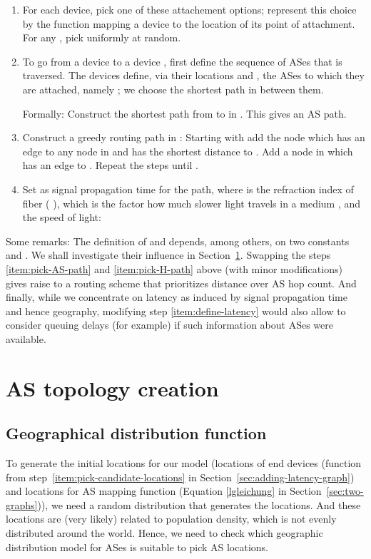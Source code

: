 \documentclass{sig-alternate-10pt}
\begin{document}
\begin{enumerate}
\begin{enumerate}
\item \label{item:pick-location} For each device, pick one of these attachement options; represent this choice by the function  mapping a device  to the location of its point of attachment. 
For any , pick  uniformly at random. 

\item  \label{item:pick-AS-path} To go from a device  to a device , first define the sequence of ASes that is traversed. The devices define, via their locations  and ,  the ASes to which they are attached, namely ; we choose the shortest path in  between them. 

Formally: Construct the shortest path    from  to  in . This gives an AS path.
\item \label{item:pick-H-path} Construct a greedy routing path  in : Starting with  add the node  which has an edge to any node in  and has the shortest distance to . Add a node in  which has an edge to . Repeat the steps until .
\item \label{item:define-latency} Set  as signal propagation time for the path, where  is the refraction index of fiber ( \cite{Ramaswami2009}), which is the factor how much slower light travels in a medium , and  the speed of light:


\end{enumerate}

\noindent Some remarks: The definition of  and  depends, among others, on two constants  and . We shall investigate their influence in Section~\ref{sec:as-topology-creation}. Swapping the steps \ref{item:pick-AS-path} and \ref{item:pick-H-path} above (with minor modifications) gives raise to a routing scheme that prioritizes distance over AS hop count. And finally, while we concentrate on latency as induced by signal propagation time and hence geography, modifying step \ref{item:define-latency} would also allow to consider queuing delays (for example) if such information about ASes were available. 



\section{AS topology creation}
\label{sec:as-topology-creation}
\subsection{Geographical distribution function}
To generate the initial locations for our model (locations of end devices (function  from
step~\ref{item:pick-candidate-locations} in Section~\ref{sec:adding-latency-graph}) and locations for AS mapping function  (Equation \ref{lgleichung} in Section~\ref{sec:two-graphs})), we need a random distribution that generates the locations. 
And these locations are (very likely) related to population density, which is  not evenly distributed around the world. Hence, we need to check which geographic distribution model for ASes is suitable to pick AS locations.  


\end{enumerate}
\end{document}
